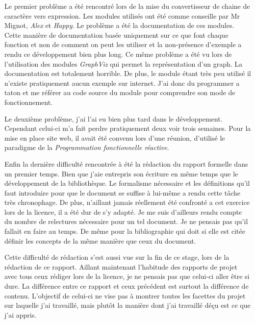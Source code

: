 \vphantom{}

Le premier problème a été rencontré lors de la mise du convertisseur de chaine 
de caractère vers expression. Les modules utilisés ont été comme conseille par 
Mr Mignot, \textit{Alex} et \textit{Happy}. Le problème a été la documentation 
de ces modules. Cette manière de documentation basée uniquement sur ce que font 
chaque fonction et non de comment on peut les utiliser et la non-présence 
d'exemple a rendu ce développement bien plus long. Ce même problème a été vu 
lors de l'utilisation des modules \textit{GraphViz} qui permet la représentation
d'un graph. La documentation est totalement horrible. De plus, le module étant 
très peu utilisé il n'existe pratiquement aucun exemple sur internet. J'ai donc
du programmer a taton et me référer au code source du module pour comprendre 
son mode de fonctionnement.

\vphantom{}

Le deuxième problème, j'ai l'ai eu bien plus tard dans le développement. 
Cependant celui-ci m’a fait perdre pratiquement deux voir trois semaines. Pour 
la mise en place site web, il avait été convenu lors d'une réunion, d'utilisé 
le paradigme de la \textit{Programmation fonctionnelle réactive}. 

\vphantom{}

Enfin la dernière difficulté rencontrée à été la rédaction du rapport formelle 
dans un premier temps. Bien que j'aie entrepris son écriture en même temps que 
le développement de la bibliothèque. Le formalisme nécessaire et les définitions 
qu'il faut introduire pour que le document se suffise à lui-même a rendu cette 
tâche très chronophage. De plus, n'aillant jamais réellement été confronté a 
cet exercice lors de la licence, il a été dur de s'y adapté. Je me suis 
d'ailleurs rendu compte du nombre de relectures nécessaire pour un tel document. 
Je ne pensais pas qu'il fallait en faire au temps. De même pour la bibliographie 
qui doit si elle est citée définir les concepts de la même manière que ceux 
du document.

Cette difficulté de rédaction s'est aussi vue sur la fin de ce stage, lors de la 
rédaction de ce rapport. Aillant maintenant l'habitude des rapports de projet 
avec tous ceux rédiger lors de la licence, je ne pensais pas que celui-ci aller 
être si dure. La différence entre ce rapport et ceux précédent est surtout la 
différence de contenu. L'objectif de celui-ci ne vise pas à montrer toutes les 
facettes du projet sur laquelle j'ai travaillé, mais plutôt la manière dont j'ai 
travaillé déçu est ce que j'ai appris. 


